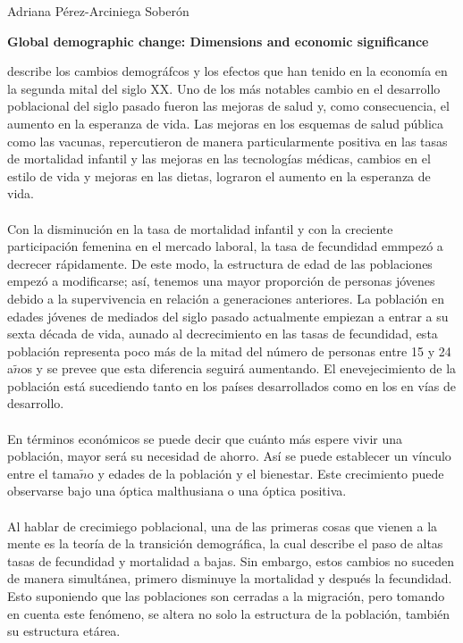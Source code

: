 \documentclass[11pt,spanish,letterpaper]{article}
\theoremstyle{plain}
\begin{document}
\begin{flushleft}
Adriana P\'erez-Arciniega Sober\'on
\end{flushleft}
\begin{center}
\textbf{Global demographic change: Dimensions and economic significance}
\end{center} 
\cite{bloom2004global} describe los cambios demogr\'afcos y los efectos que han tenido en la econom\'ia en la segunda mital del siglo XX. Uno de los m\'as notables cambio en el desarrollo poblacional del siglo pasado fueron las mejoras de salud y, como consecuencia, el aumento en la esperanza de vida. Las mejoras en los esquemas de salud p\'ublica como las vacunas, repercutieron de manera particularmente positiva en las tasas de mortalidad infantil y las mejoras en las tecnolog\'ias m\'edicas, cambios en el estilo de vida y mejoras en las dietas, lograron el aumento en la esperanza de vida.\\
\\
Con la disminuci\'on en la tasa de mortalidad infantil y con la creciente participaci\'on femenina en el mercado laboral, la tasa de fecundidad emmpez\'o a decrecer r\'apidamente. De este modo, la estructura de edad de las poblaciones empez\'o a modificarse; as\'i, tenemos una mayor proporci\'on de personas j\'ovenes debido a la supervivencia en relaci\'on a generaciones anteriores. La poblaci\'on en edades j\'ovenes de mediados del siglo pasado actualmente empiezan a entrar a su sexta d\'ecada de vida, aunado al decrecimiento en las tasas de fecundidad, esta poblaci\'on representa poco m\'as de la mitad del n\'umero de personas entre 15 y 24 a$\tilde{n}$os y se prevee que esta diferencia seguir\'a aumentando. El enevejecimiento de la poblaci\'on est\'a sucediendo tanto en los pa\'ises desarrollados como en los en v\'ias de desarrollo.\\
\\
En t\'erminos econ\'omicos se puede decir que cu\'anto m\'as espere vivir una poblaci\'on, mayor ser\'a su necesidad de ahorro. As\'i se puede establecer un v\'inculo entre el tama$\tilde{n}$o y edades de la poblaci\'on y el bienestar. Este crecimiento puede observarse bajo una \'optica malthusiana o una \'optica positiva.\\
\\
Al hablar de crecimiego poblacional, una de las primeras cosas que vienen a la mente es la teor\'ia de la transici\'on demogr\'afica, la cual describe el paso de altas tasas de fecundidad y mortalidad a bajas. Sin embargo, estos cambios no suceden de manera simult\'anea, primero disminuye la mortalidad y despu\'es la fecundidad. Esto suponiendo que las poblaciones son cerradas a la migraci\'on, pero tomando en cuenta este fen\'omeno, se altera no solo la estructura de la poblaci\'on, tambi\'en su estructura et\'area.


\end{document}
